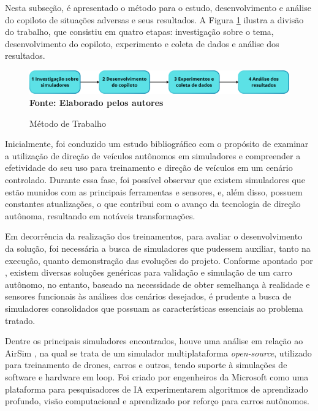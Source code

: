 \documentclass[a4paper,12pt,Times]{article}
\begin{document}
Nesta subseção, é apresentado o método para o estudo, desenvolvimento e análise do copiloto de situações adversas e seus resultados. A Figura \ref{fig:metodologia_tcc} ilustra a divisão do trabalho, que consistiu em quatro etapas: investigação sobre o tema, desenvolvimento do copiloto, experimento e coleta de dados e análise dos resultados.

\begin{figure}[H]
    \centering
    \caption{Método de Trabalho}
    \includegraphics[scale=0.55]{figuras/Metodologia TCC.png}\captionsetup{justification=centering}
  \vspace{-0.2cm}
     \\\textbf{\footnotesize Fonte: Elaborado pelos autores}
    \label{fig:metodologia_tcc}
\end{figure}

Inicialmente, foi conduzido um estudo bibliográfico com o propósito de examinar a utilização de direção de veículos autônomos em simuladores e compreender a efetividade do seu uso para treinamento e direção de veículos em um cenário controlado. Durante essa fase, foi possível observar que existem simuladores que estão munidos com as principais ferramentas e sensores, e, além disso, possuem constantes atualizações, o que contribui com o avanço da tecnologia de direção autônoma, resultando em notáveis transformações.

Em decorrência da realização dos treinamentos, para avaliar o desenvolvimento da solução, foi necessária a busca de simuladores que pudessem auxiliar, tanto na execução, quanto demonstração das evoluções do projeto. Conforme apontado por , existem diversas soluções genéricas para validação e simulação de um carro autônomo, no entanto, baseado na necessidade de obter semelhança à realidade e sensores funcionais às análises dos cenários desejados, é prudente a busca de simuladores consolidados que possuam as características essenciais ao problema tratado.

Dentre os principais simuladores encontrados, houve uma análise em relação ao AirSim \cite{airsim2017fsr}, na qual se trata de um simulador multiplataforma \textit{open-source}, utilizado para treinamento de drones, carros e outros, tendo suporte à simulações de software e hardware em loop. Foi criado por engenheiros da Microsoft como uma plataforma para pesquisadores de IA experimentarem algoritmos de aprendizado profundo, visão computacional e aprendizado por reforço para carros autônomos.
\end{document}
